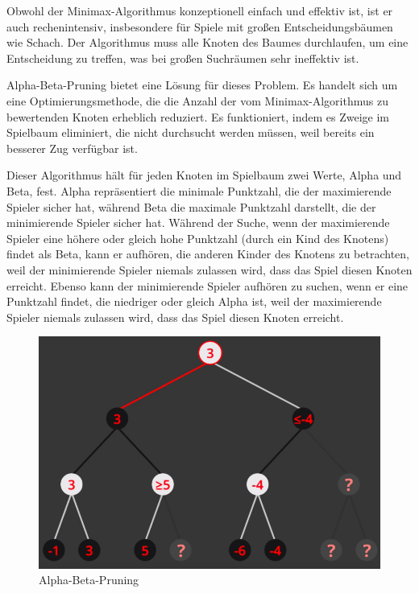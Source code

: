 Obwohl der Minimax-Algorithmus konzeptionell einfach und effektiv ist, ist er auch rechenintensiv, insbesondere für Spiele mit großen Entscheidungsbäumen wie Schach. 
Der Algorithmus muss alle Knoten des Baumes durchlaufen, um eine Entscheidung zu treffen, was bei großen Suchräumen sehr ineffektiv ist.

Alpha-Beta-Pruning bietet eine Lösung für dieses Problem. Es handelt sich um eine Optimierungsmethode, die die Anzahl der vom Minimax-Algorithmus 
zu bewertenden Knoten erheblich reduziert. Es funktioniert, indem es Zweige im Spielbaum eliminiert, 
die nicht durchsucht werden müssen, weil bereits ein besserer Zug verfügbar ist.

Dieser Algorithmus hält für jeden Knoten im Spielbaum zwei Werte, Alpha und Beta, fest. Alpha repräsentiert die minimale Punktzahl, 
die der maximierende Spieler sicher hat, während Beta die maximale Punktzahl darstellt, die der minimierende Spieler sicher hat. 
Während der Suche, wenn der maximierende Spieler eine höhere oder gleich hohe Punktzahl (durch ein Kind des Knotens) findet als Beta, kann er aufhören, 
die anderen Kinder des Knotens zu betrachten, weil der minimierende Spieler niemals zulassen wird, dass das Spiel diesen Knoten erreicht. 
Ebenso kann der minimierende Spieler aufhören zu suchen, wenn er eine Punktzahl findet, die niedriger oder gleich Alpha ist, 
weil der maximierende Spieler niemals zulassen wird, dass das Spiel diesen Knoten erreicht.
\begin{figure}[ht]
    \centering
    \includegraphics[scale=0.5]{images/alpha-beta-pruning.png}
    \caption{Alpha-Beta-Pruning}
\end{figure}

